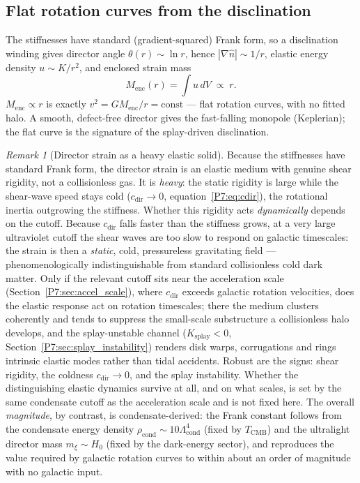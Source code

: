 \documentclass[11pt,a4paper]{article}
\theoremstyle{definition}
\theoremstyle{remark}
\newtheorem{remark}[theorem]{Remark}
\newcommand{\TCMB}{T_{\mathrm{CMB}}}
\newcommand{\Lcond}{\Lambda_{\mathrm{cond}}}
\begin{document}
\subsection{Flat rotation curves from the disclination}
\label{P7:sec:flat_curves}

The stiffnesses have standard (gradient-squared) Frank form, so a
disclination winding gives director angle $\theta(r)\sim\ln r$, hence
$|\nabla\hat{n}|\sim1/r$, elastic energy density $u\sim K/r^2$, and
enclosed strain mass
\begin{equation}
  M_{\mathrm{enc}}(r)=\int u\,dV \;\propto\; r.
  \label{P7:eq:Menc}
\end{equation}
$M_{\mathrm{enc}}\propto r$ is exactly $v^2=GM_{\mathrm{enc}}/r=\text{const}$
--- flat rotation curves, with no fitted halo.  A smooth, defect-free
director gives the fast-falling monopole (Keplerian); the flat curve is
the signature of the splay-driven disclination.

\begin{remark}[Director strain as a heavy elastic solid]
\label{P7:rem:elastic_solid}
Because the stiffnesses have standard Frank form, the director strain is
an elastic medium with genuine shear rigidity, not a collisionless gas.
It is \emph{heavy}: the static rigidity is large while the shear-wave
speed stays cold ($c_{\mathrm{dir}}\to0$, equation~\eqref{P7:eq:cdir}),
the rotational inertia outgrowing the stiffness.  Whether this rigidity
acts \emph{dynamically} depends on the cutoff.  Because
$c_{\mathrm{dir}}$ falls faster than the stiffness grows, at a very large
ultraviolet cutoff the shear waves are too slow to respond on galactic
timescales: the strain is then a \emph{static}, cold, pressureless
gravitating field --- phenomenologically indistinguishable from standard
collisionless cold dark matter.  Only if the relevant cutoff sits near
the acceleration scale (Section~\ref{P7:sec:accel_scale}), where
$c_{\mathrm{dir}}$ exceeds galactic rotation velocities, does the elastic
response act on rotation timescales; there the medium clusters coherently
and tends to suppress the small-scale substructure a collisionless halo
develops, and the splay-unstable channel ($K_{\mathrm{splay}}<0$,
Section~\ref{P7:sec:splay_instability}) renders disk warps, corrugations
and rings intrinsic elastic modes rather than tidal accidents.  Robust
are the signs: shear rigidity, the coldness $c_{\mathrm{dir}}\to0$, and
the splay instability.  Whether the distinguishing elastic dynamics
survive at all, and on what scales, is set by the same condensate cutoff
as the acceleration scale and is not fixed here.  The overall
\emph{magnitude}, by contrast, is condensate-derived: the Frank constant
follows from the condensate energy density
$\rho_{\mathrm{cond}}\sim10\Lcond^4$ (fixed by $\TCMB$) and the ultralight
director mass $m_\xi\sim H_0$ (fixed by the dark-energy sector), and
reproduces the value required by galactic rotation curves to within about
an order of magnitude with no galactic input.
\end{remark}
\end{document}

